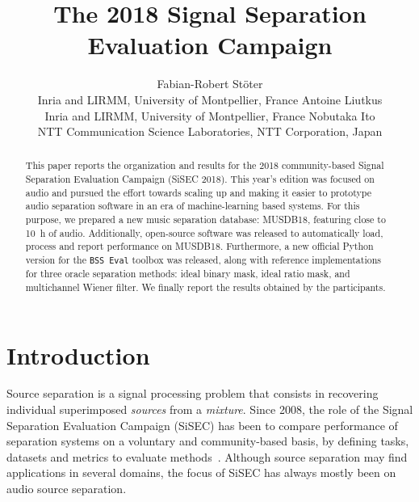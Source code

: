 \documentclass{article}
\begin{document}
\title{The 2018 Signal Separation Evaluation Campaign}

\author{
  Fabian-Robert Stöter \\
  Inria and LIRMM, University of Montpellier, France
  \And
  Antoine Liutkus \\
  Inria and LIRMM, University of Montpellier, France
  \And
  Nobutaka Ito \\
  NTT Communication Science Laboratories, NTT Corporation, Japan
}

\maketitle
%
\vspace{-3mm}
\begin{abstract}
This paper reports the organization and results for the 2018 community-based Signal Separation Evaluation Campaign (SiSEC 2018). This year's edition was focused on audio and pursued the effort towards scaling up and making it easier to prototype audio separation software in an era of machine-learning based systems. For this purpose, we prepared a new music separation database: MUSDB18, featuring close to 10~h of audio. Additionally, open-source software was released to automatically load, process and report performance on MUSDB18. Furthermore, a new official Python version for the \texttt{BSS~Eval} toolbox was released, along with reference implementations for three oracle separation methods: ideal binary mask, ideal ratio mask, and multichannel Wiener filter. We finally report the results obtained by the participants.
\end{abstract}

\setcounter{footnote}{0}
\section{Introduction}
\vspace{-2mm}
Source separation is a signal processing problem that consists in recovering individual superimposed \textit{sources} from a \textit{mixture}.  Since 2008, the role of the Signal Separation Evaluation Campaign (SiSEC) has been to compare performance of separation systems on a voluntary and community-based basis, by defining tasks, datasets and metrics to evaluate methods~\cite{sassec2007,sisec2008,sisec0710,sisec2011,sisec2013,sisec2015,sisec2016}. Although source separation may find applications in several domains, the focus of SiSEC has always mostly been on audio source separation.
\end{document}
